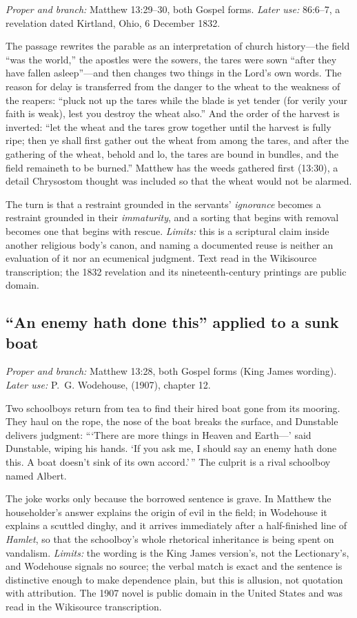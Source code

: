 \emph{Proper and branch:} Matthew 13:29--30, both Gospel forms.
\emph{Later use:}  86:6--7, a revelation dated
Kirtland, Ohio, 6 December 1832.

The passage rewrites the parable as an interpretation of church history---the
field ``was the world,'' the apostles were the sowers, the tares were sown
``after they have fallen asleep''---and then changes two things in the Lord's own
words. The reason for delay is transferred from the danger to the wheat to the
weakness of the reapers: ``pluck not up the tares while the blade is yet tender
(for verily your faith is weak), lest you destroy the wheat also.'' And the
order of the harvest is inverted: ``let the wheat and the tares grow together
until the harvest is fully ripe; then ye shall first gather out the wheat from
among the tares, and after the gathering of the wheat, behold and lo, the tares
are bound in bundles, and the field remaineth to be burned.'' Matthew has the
weeds gathered first (13:30), a detail Chrysostom thought was included so that
the wheat would not be alarmed.

The turn is that a restraint grounded in the servants' \emph{ignorance} becomes
a restraint grounded in their \emph{immaturity}, and a sorting that begins with
removal becomes one that begins with rescue. \emph{Limits:} this is a
scriptural claim inside another religious body's canon, and naming a documented
reuse is neither an evaluation of it nor an ecumenical judgment. Text read in
the Wikisource transcription; the 1832 revelation and its nineteenth-century
printings are public domain.

\subsection*{``An enemy hath done this'' applied to a sunk boat}

\emph{Proper and branch:} Matthew 13:28, both Gospel forms (King James
wording).
\emph{Later use:} P.~G. Wodehouse,  (1907), chapter 12.

Two schoolboys return from tea to find their hired boat gone from its mooring.
They haul on the rope, the nose of the boat breaks the surface, and Dunstable
delivers judgment: ```There are more things in Heaven and Earth---' said
Dunstable, wiping his hands. `If you ask me, I should say an enemy hath done
this. A boat doesn't sink of its own accord.'\,'' The culprit is a rival
schoolboy named Albert.

The joke works only because the borrowed sentence is grave. In Matthew the
householder's answer explains the origin of evil in the field; in Wodehouse it
explains a scuttled dinghy, and it arrives immediately after a half-finished
line of \emph{Hamlet}, so that the schoolboy's whole rhetorical inheritance is
being spent on vandalism. \emph{Limits:} the wording is the King James
version's, not the Lectionary's, and Wodehouse signals no source; the verbal
match is exact and the sentence is distinctive enough to make dependence
plain, but this is allusion, not quotation with attribution. The 1907 novel is
public domain in the United States and was read in the Wikisource
transcription.

